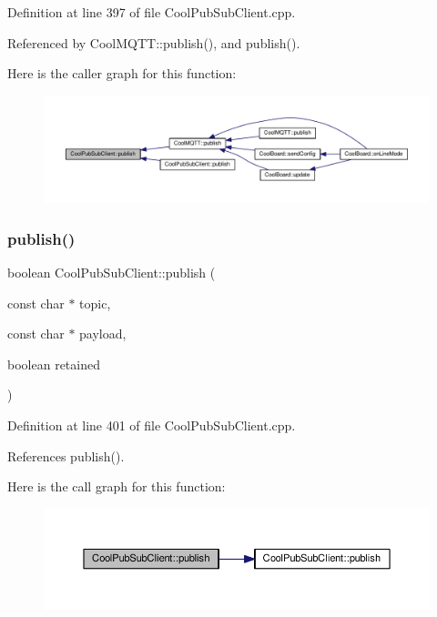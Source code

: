 Definition at line 397 of file Cool\+Pub\+Sub\+Client.\+cpp.



Referenced by Cool\+M\+Q\+T\+T\+::publish(), and publish().

Here is the caller graph for this function\+:\nopagebreak
\begin{figure}[H]
\begin{center}
\leavevmode
\includegraphics[width=350pt]{d8/d4b/class_cool_pub_sub_client_ab6ad5fa2d3db8f91454027257f225a89_icgraph}
\end{center}
\end{figure}
\mbox{\label{class_cool_pub_sub_client_a0b01cef98af0b57d8da4df373e196448}} 
\subsubsection{\texorpdfstring{publish()}{publish()}\hspace{0.1cm}{\footnotesize\ttfamily [2/4]}}
{\footnotesize\ttfamily boolean Cool\+Pub\+Sub\+Client\+::publish (\begin{DoxyParamCaption}\item[{const char $\ast$}]{topic,  }\item[{const char $\ast$}]{payload,  }\item[{boolean}]{retained }\end{DoxyParamCaption})}



Definition at line 401 of file Cool\+Pub\+Sub\+Client.\+cpp.



References publish().

Here is the call graph for this function\+:\nopagebreak
\begin{figure}[H]
\begin{center}
\leavevmode
\includegraphics[width=350pt]{d8/d4b/class_cool_pub_sub_client_a0b01cef98af0b57d8da4df373e196448_cgraph}
\end{center}
\end{figure}
\mbox{\label{class_cool_pub_sub_client_abf184c0968a6655b68b5fdfbbc0c87d1}} 

